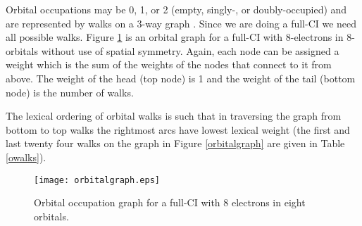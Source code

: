 \documentclass[fullpage,12pt,fleqn]{article}
\begin{document}
Orbital occupations may be 0, 1, or 2 (empty, singly-, or
doubly-occupied) and are represented by walks on a 3-way graph
\cite{duchsga,duchfci}.  Since we are doing a full-CI we need all
possible walks.  Figure \ref{ograph} is an orbital graph for a full-CI
with 8-electrons in 8-orbitals without use of spatial symmetry.
Again, each node can be assigned a weight which is the sum of the
weights of the nodes that connect to it from above.  The weight of the
head (top node) is 1 and the weight of the tail (bottom node) is the
number of walks.


The lexical ordering of orbital walks is such that in traversing the
graph from bottom to top walks the rightmost arcs have lowest lexical
weight (the first and last twenty four walks on the graph in Figure
\ref{orbitalgraph} are given in Table \ref{owalks}).

\begin{figure}[htbp]

\center

\texttt{[image: orbitalgraph.eps]}
\caption{\label{ograph} Orbital occupation graph for a full-CI with 8
electrons in eight orbitals.}
\end{figure}
\end{document}
